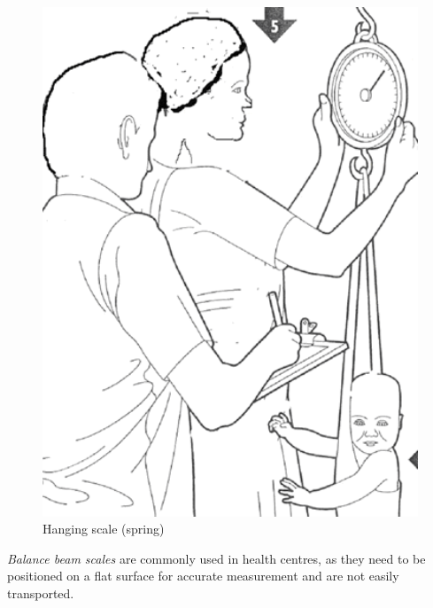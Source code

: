 \documentclass[
  12pt,
]{book}
\begin{document}
\begin{figure}

{\centering \includegraphics[width=5.08in]{images/hangingScale} 

}

\caption{Hanging scale (spring)}\label{fig:weight2}
\end{figure}

\emph{Balance beam scales} are commonly used in health centres, as they need to be positioned on a flat surface for accurate measurement and are not easily transported.
\end{document}
